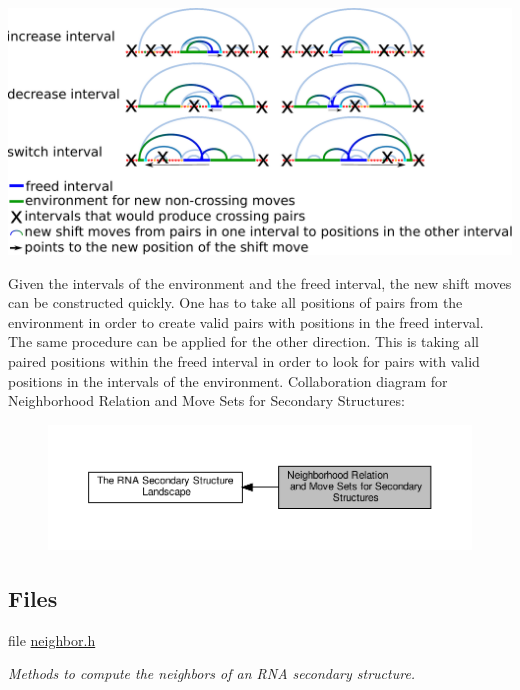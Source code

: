  
\begin{DoxyImageNoCaption}
  \mbox{\includegraphics[width=\textwidth,height=\textheight/2,keepaspectratio=true]{shift_move_intervals}}
\end{DoxyImageNoCaption}


Given the intervals of the environment and the freed interval, the new shift moves can be constructed quickly. One has to take all positions of pairs from the environment in order to create valid pairs with positions in the freed interval. The same procedure can be applied for the other direction. This is taking all paired positions within the freed interval in order to look for pairs with valid positions in the intervals of the environment. Collaboration diagram for Neighborhood Relation and Move Sets for Secondary Structures\+:
\nopagebreak
\begin{figure}[H]
\begin{center}
\leavevmode
\includegraphics[width=350pt]{group__neighbors}
\end{center}
\end{figure}
\subsection*{Files}
\begin{DoxyCompactItemize}
\item 
file \hyperlink{neighbor_8h}{neighbor.\+h}
\begin{DoxyCompactList}\small\item\em Methods to compute the neighbors of an R\+NA secondary structure. \end{DoxyCompactList}\end{DoxyCompactItemize}
